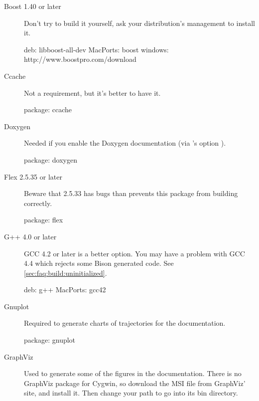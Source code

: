 \begin{description}
\item[Boost 1.40 or later] Don't try to build it yourself, ask your
  distribution's management to install it.
\begin{package}
deb: libboost-all-dev
MacPorts: boost
windows: http://www.boostpro.com/download
\end{package}

\item[Ccache]
  Not a requirement, but it's better to have it.
\begin{package}
package: ccache
\end{package}

\item[Doxygen] Needed if you enable the Doxygen documentation (via
  's option ).
\begin{package}
package: doxygen
\end{package}

\item[Flex 2.5.35 or later]
  Beware that 2.5.33 has bugs than prevents this package from building
  correctly.
\begin{package}
package: flex
\end{package}

\item[G++ 4.0 or later] GCC 4.2 or later is a better option.  You may have a
  problem with GCC 4.4 which rejects some Bison generated code.  See
  \autoref{sec:faq:build:uninitialized}.
\begin{package}
deb: g++
MacPorts: gcc42
\end{package}

\item[Gnuplot]
  Required to generate charts of trajectories for the documentation.
\begin{package}
package: gnuplot
\end{package}

\item[GraphViz] Used to generate some of the figures in the
  documentation.  There is no GraphViz package for Cygwin, so download
  the MSI file from GraphViz' site, and install it.  Then change your
  path to go into its bin directory.



\end{description}
